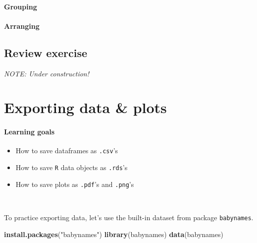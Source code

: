 \documentclass[
]{book}
\newenvironment{Shaded}{\begin{snugshade}}{\end{snugshade}}
\newcommand{\KeywordTok}[1]{\textcolor[rgb]{0.13,0.29,0.53}{\textbf{#1}}}
\newcommand{\NormalTok}[1]{#1}
\newcommand{\StringTok}[1]{\textcolor[rgb]{0.31,0.60,0.02}{#1}}
\providecommand{\tightlist}{%
  \setlength{\itemsep}{0pt}\setlength{\parskip}{0pt}}
\begin{document}
\hypertarget{grouping}{%
\subsubsection*{Grouping}\label{grouping}}

\hypertarget{arranging}{%
\subsubsection*{Arranging}\label{arranging}}

\hypertarget{review-exercise-1}{%
\section*{Review exercise}\label{review-exercise-1}}

\emph{NOTE: Under construction!}

\hypertarget{exporting-data-plots}{%
\chapter{Exporting data \& plots}\label{exporting-data-plots}}

\hypertarget{learning-goals-10}{%
\subsubsection*{Learning goals}\label{learning-goals-10}}

\begin{itemize}
\tightlist
\item
  How to save dataframes as \texttt{.csv}'s
\item
  How to save \texttt{R} data objects as \texttt{.rds}'s
\item
  How to save plots as \texttt{.pdf}'s and \texttt{.png}'s
\end{itemize}

~

To practice exporting data, let's use the built-in dataset from package \texttt{babynames}.

\begin{Shaded}
\begin{Highlighting}[]
\KeywordTok{install.packages}\NormalTok{(}\StringTok{"babynames"}\NormalTok{)}
\KeywordTok{library}\NormalTok{(babynames)}
\KeywordTok{data}\NormalTok{(babynames)}
\end{Highlighting}
\end{Shaded}
\end{document}
